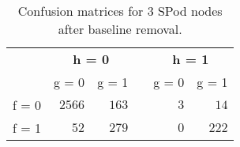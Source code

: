 \begin{table}[!tbp]
\caption{Confusion matrices for 3 SPod nodes after baseline removal.\label{get}} 
\begin{center}
\begin{tabular}{lrrcrr}
\hline\hline
\multicolumn{1}{l}{\bfseries }&\multicolumn{2}{c}{\bfseries h = 0}&\multicolumn{1}{c}{\bfseries }&\multicolumn{2}{c}{\bfseries h = 1}\tabularnewline
\cline{2-3} \cline{5-6}
\multicolumn{1}{l}{}&\multicolumn{1}{c}{g = 0}&\multicolumn{1}{c}{g = 1}&\multicolumn{1}{c}{}&\multicolumn{1}{c}{g = 0}&\multicolumn{1}{c}{g = 1}\tabularnewline
\hline
f = 0&$2566$&$163$&&$3$&$ 14$\tabularnewline
f = 1&$  52$&$279$&&$0$&$222$\tabularnewline
\hline
\end{tabular}\end{center}
\end{table}
